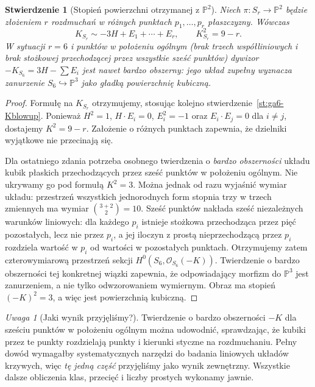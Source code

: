 \documentclass[11pt,a4paper,openany]{report}
\numberwithin{equation}{section}
\theoremstyle{plain}
\newtheorem{stwierdzenie}[twierdzenie]{Stwierdzenie}
\theoremstyle{definition}
\theoremstyle{remark}
\newtheorem{uwaga}[twierdzenie]{Uwaga}
\newcommand{\PP}{\mathbb P}
\begin{document}
\begin{stwierdzenie}[Stopień powierzchni otrzymanej z $\PP^2$]
\label{st:ga6-del-pezzo-degree}
Niech $\pi:S_r\to\PP^2$ będzie złożeniem
$r$ rozdmuchań w \emph{różnych} punktach
$p_1,\ldots,p_r$ płaszczyzny. Wówczas
\[
 K_{S_r}\sim-3H+E_1+\cdots+E_r,
 \qquad K_{S_r}^2=9-r.
\]
W sytuacji $r=6$ i punktów w położeniu ogólnym
(brak trzech współliniowych i brak stożkowej
przechodzącej przez wszystkie sześć punktów)
dywizor $-K_{S_6}=3H-\sum E_i$ jest nawet
\emph{bardzo obszerny}: jego układ zupełny
wyznacza zanurzenie $S_6\hookrightarrow\PP^3$
jako gładką powierzchnię kubiczną.
\end{stwierdzenie}
\begin{proof}
Formułę na $K_{S_r}$ otrzymujemy, stosując kolejno
stwierdzenie~\ref{st:ga6-Kblowup}. Ponieważ
$H^2=1$, $H\cdot E_i=0$, $E_i^2=-1$
oraz $E_i\cdot E_j=0$ dla $i\ne j$, dostajemy
$K^2=9-r$. Założenie o różnych punktach zapewnia,
że dzielniki wyjątkowe nie przecinają się.

Dla ostatniego zdania potrzeba osobnego twierdzenia
o \emph{bardzo obszerności} układu kubik
płaskich przechodzących przez sześć punktów
w położeniu ogólnym. Nie ukrywamy go pod formułą
$K^2=3$. Można jednak od razu wyjaśnić wymiar
układu: przestrzeń wszystkich jednorodnych form
stopnia trzy w trzech zmiennych ma wymiar
$\binom{3+2}{2}=10$. Sześć punktów nakłada
sześć niezależnych warunków liniowych: dla każdego
$p_i$ istnieje stożkowa przechodząca przez pięć
pozostałych, lecz nie przez $p_i$, a jej iloczyn
z prostą nieprzechodzącą przez $p_i$ rozdziela
wartość w $p_i$ od wartości w pozostałych punktach.
Otrzymujemy zatem czterowymiarową przestrzeń
sekcji $H^0(S_6,\mathcal O_{S_6}(-K))$.
Twierdzenie o bardzo obszerności tej konkretnej
wiązki zapewnia, że odpowiadający morfizm do
$\PP^3$ jest zanurzeniem, a nie tylko odwzorowaniem
wymiernym. Obraz ma stopień
$(-K)^2=3$, a więc jest powierzchnią kubiczną.
\end{proof}

\begin{uwaga}[Jaki wynik przyjęliśmy?]
Twierdzenie o bardzo obszerności $-K$ dla
sześciu punktów w położeniu ogólnym można udowodnić,
sprawdzając, że kubiki przez te punkty rozdzielają
punkty i kierunki styczne na rozdmuchaniu.
Pełny dowód wymagałby systematycznych narzędzi
do badania liniowych układów krzywych, więc
\emph{tę jedną część} przyjęliśmy jako wynik
zewnętrzny. Wszystkie dalsze obliczenia klas,
przecięć i liczby prostych wykonamy jawnie.
\end{uwaga}
\end{document}
